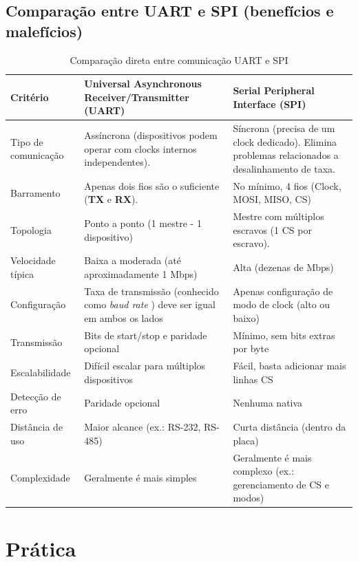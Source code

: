 \documentclass[a4paper,oneside,10pt]{article}
\begin{document}
\subsection{Comparação entre UART e SPI (benefícios e malefícios)}

\begin{table}[h]
	\centering
	\setlength{\tabcolsep}{10pt}
	\renewcommand{\arraystretch}{2}
	\small
	\begin{tabular}{|l|p{5.5cm}|p{5.5cm}|}
		\hline
		\textbf{Critério} & \textbf{\nohyphens{Universal Asynchronous Receiver/Transmitter (UART)}} & \textbf{Serial Peripheral Interface (SPI)} \\
		\hline
		Tipo de comunicação & Assíncrona (dispositivos podem operar com clocks internos independentes). & Síncrona (precisa de um clock dedicado). Elimina problemas relacionados a desalinhamento de taxa. \\
		\hline
		Barramento & Apenas dois fios são o suficiente (\textbf{TX} e \textbf{RX}). & No mínimo, 4 fios (Clock, MOSI, MISO, CS) \\
		\hline
		Topologia & Ponto a ponto (1 mestre - 1 dispositivo) & Mestre com múltiplos escravos (1 CS por escravo). \\
		\hline
		Velocidade típica & Baixa a moderada (até aproximadamente 1 Mbps) & Alta (dezenas de Mbps) \\
		\hline
		Configuração & Taxa de transmissão (conhecido como \textit{baud rate }) deve ser igual em ambos os lados & Apenas configuração de modo de clock (alto ou baixo) \\
		\hline
		Transmissão & Bits de start/stop e paridade opcional & Mínimo, sem bits extras por byte \\
		\hline
		Escalabilidade & Difícil escalar para múltiplos dispositivos & Fácil, basta adicionar mais linhas CS \\
		\hline
		Detecção de erro & Paridade opcional & Nenhuma nativa \\
		\hline
		Distância de uso & Maior alcance (ex.: RS-232, RS-485) & Curta distância (dentro da placa) \\
		\hline
		Complexidade& Geralmente é mais simples & Geralmente é mais complexo (ex.: gerenciamento de CS e modos) \\
		\hline
	\end{tabular}
	\caption{Comparação direta entre comunicação UART e SPI}
	\label{tab:uart_spi}
\end{table}
\newpage
\section{Prática}
\end{document}
